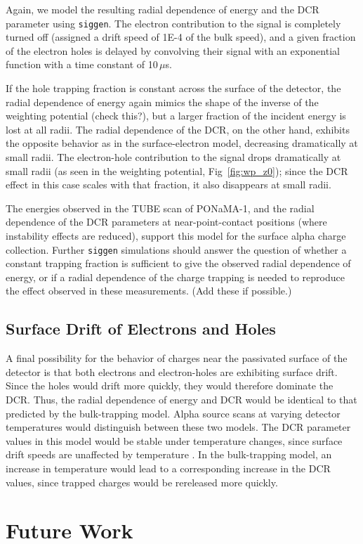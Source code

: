 Again, we model the resulting radial dependence of energy and the DCR parameter using {\tt siggen}. The electron contribution to the signal is completely turned off (assigned a drift speed of 1E-4 of the bulk speed), and a given fraction of the electron holes is delayed by convolving their signal with an exponential function with a time constant of 10\,$\mu$s. 

If the hole trapping fraction is constant across the surface of the detector, the radial dependence of energy again mimics the shape of the inverse of the weighting potential (check this?), but a larger fraction of the incident energy is lost at all radii. The radial dependence of the DCR, on the other hand, exhibits the opposite behavior as in the surface-electron model, decreasing dramatically at small radii. The electron-hole contribution to the signal drops dramatically at small radii (as seen in the weighting potential, Fig~\ref{fig:wp_z0}); since the DCR effect in this case scales with that fraction, it also disappears at small radii. 

The energies observed in the TUBE scan of PONaMA-1, and the radial dependence of the DCR parameters at near-point-contact positions (where instability effects are reduced), support this model for the surface alpha charge collection. Further {\tt siggen} simulations should answer the question of whether a constant trapping fraction is sufficient to give the observed radial dependence of energy, or if a radial dependence of the charge trapping is needed to reproduce the effect observed in these measurements. (Add these if possible.)

\subsection{Surface Drift of Electrons and Holes}
A final possibility for the behavior of charges near the passivated surface of the detector is that both electrons and electron-holes are exhibiting surface drift. Since the holes would drift more quickly, they would therefore dominate the DCR. Thus, the radial dependence of energy and DCR would be identical to that predicted by the bulk-trapping model. Alpha source scans at varying detector temperatures would distinguish between these two models. The DCR parameter values in this model would be stable under temperature changes, since surface drift speeds are unaffected by temperature \cite{Mullowney2012?}. In the bulk-trapping model, an increase in temperature would lead to a corresponding increase in the DCR values, since trapped charges would be rereleased more quickly. 

\section{Future Work}

